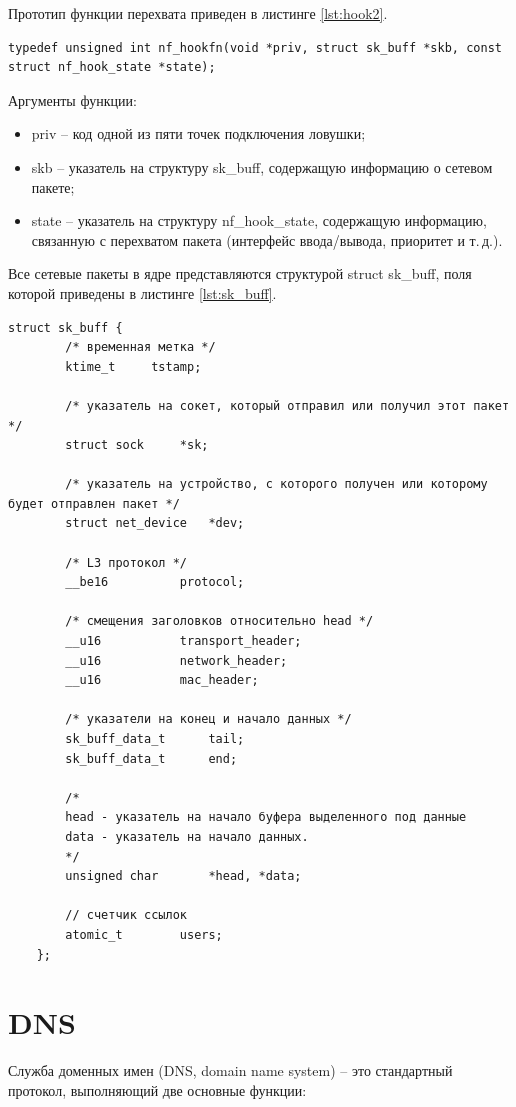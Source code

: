Прототип функции перехвата приведен в листинге \ref{lst:hook2}.

\begin{lstlisting}[caption = {Прототип функции-ловушки}, label=lst:hook2]
typedef unsigned int nf_hookfn(void *priv, struct sk_buff *skb, const struct nf_hook_state *state);
\end{lstlisting}

Аргументы функции:
\begin{itemize}
	\item priv -- код одной из пяти точек подключения ловушки;
	\item skb -- указатель на структуру sk\_buff, содержащую информацию о сетевом пакете; 
	\item state -- указатель на структуру nf\_hook\_state, содержащую информацию, связанную с перехватом пакета (интерфейс ввода/вывода, приоритет и т.\,д.).
\end{itemize}

\clearpage
Все сетевые пакеты в ядре представляются структурой struct sk\_buff, поля которой приведены в листинге \ref{lst:sk_buff}.


\begin{lstlisting}[caption = {Структура struct sk\_buff}, label=lst:sk_buff]
	struct sk_buff {
		/* временная метка */
		ktime_t     tstamp;
		
		/* указатель на сокет, который отправил или получил этот пакет */
		struct sock     *sk;
		
		/* указатель на устройство, с которого получен или которому будет отправлен пакет */
		struct net_device   *dev;
		
		/* L3 протокол */
		__be16          protocol;
		
		/* смещения заголовков относительно head */
		__u16           transport_header;
		__u16           network_header;
		__u16           mac_header;
		
		/* указатели на конец и начало данных */
		sk_buff_data_t      tail;
		sk_buff_data_t      end;
		
		/* 
		head - указатель на начало буфера выделенного под данные
		data - указатель на начало данных. 
		*/
		unsigned char       *head, *data;
		
		// счетчик ссылок 
		atomic_t        users;
	};
\end{lstlisting}








\section{DNS}
Служба доменных имен (DNS, domain name system) -- это стандартный протокол, выполняющий две основные функции:

